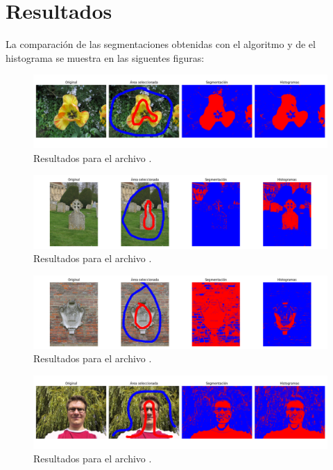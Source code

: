 \section*{Resultados}

La comparación de las segmentaciones obtenidas con el algoritmo y de el histograma se muestra en las siguentes figuras:

\begin{figure}[H]
    \centering
    \includegraphics[width=1\linewidth]{Graphics/flower/result.png}
    \caption{Resultados para el archivo .}
\end{figure}

\begin{figure}[H]
    \centering
    \includegraphics[width=1\linewidth]{Graphics/grave/result.png}
    \caption{Resultados para el archivo .}
\end{figure}

\begin{figure}[H]
    \centering
    \includegraphics[width=1\linewidth]{Graphics/memorial/result.png}
    \caption{Resultados para el archivo .}
\end{figure}

\begin{figure}[H]
    \centering
    \includegraphics[width=1\linewidth]{Graphics/person1/result.png}
    \caption{Resultados para el archivo .}
\end{figure}


